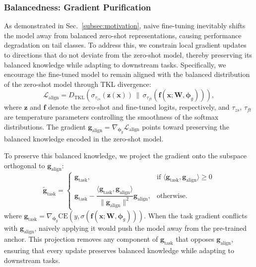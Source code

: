 \documentclass[10pt,twocolumn,letterpaper]{article}
\begin{document}
\subsubsection{Balancedness: Gradient Purification }

As demonstrated in Sec.~\ref{subsec:motivation}, naive fine-tuning inevitably shifts the model away from balanced zero-shot representations, causing performance degradation on tail classes. To address this, we constrain local gradient updates to directions that do not deviate from the zero-shot model, thereby preserving its balanced knowledge while adapting to downstream tasks. Specifically, we encourage the fine-tuned model to remain aligned with the balanced distribution of the zero-shot model through TKL divergence:
\begin{equation}
\mathcal{L}_{\text{align}} = D_{\text{TKL}} \left( \sigma_{\tau_{zs}} (\mathbf{z}(\mathbf{x})) \,\Big\|\, \sigma_{\tau_{ft}} (\mathbf{f}(\mathbf{x}; \boldsymbol{W}, \boldsymbol{\phi}_g)) \right),
\end{equation}
where $\mathbf{z}$ and $\mathbf{f}$ denote the zero-shot and fine-tuned logits, respectively, and $\tau_{zs}$, $\tau_{ft}$ are temperature parameters controlling the smoothness of the softmax distributions. The gradient $\mathbf{g}_{\text{align}} = \nabla_{\boldsymbol{\phi}_g} \mathcal{L}_{\text{align}}$ points toward preserving the balanced knowledge encoded in the zero-shot model.

To preserve this balanced knowledge, we project the gradient onto the subspace orthogonal to $\mathbf{g}_{\text{align}}$:
\begin{equation}
\tilde{\mathbf{g}}_{\text{task}} = \begin{cases}
    \mathbf{g}_{\text{task}}, & \text{if } \langle\mathbf{g}_{\text{task}}, \mathbf{g}_{\text{align}}\rangle \geq 0 \\[6pt]
    \mathbf{g}_{\text{task}} - \dfrac{\langle\mathbf{g}_{\text{task}}, \mathbf{g}_{\text{align}}\rangle}{\|\mathbf{g}_{\text{align}}\|^2} \mathbf{g}_{\text{align}}, & \text{otherwise.}
\end{cases}
\end{equation}
where $\mathbf{g}_{\text{task}} = \nabla_{\boldsymbol{\phi}_g} \text{CE}(y, \sigma(\mathbf{f}(\mathbf{x}; \boldsymbol{W}, \boldsymbol{\phi}_g)))$. When the task gradient conflicts with $\mathbf{g}_{\text{align}}$, naively applying it would push the model away from the pre-trained anchor. This projection removes any component of $\mathbf{g}_{\text{task}}$ that opposes $\mathbf{g}_{\text{align}}$, ensuring that every update preserves balanced knowledge while adapting to downstream tasks.
\end{document}

